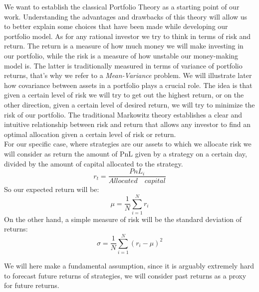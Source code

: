 We want to establish the classical Portfolio Theory as a starting point of our work. Understanding the advantages and drawbacks of this theory will allow us to better explain some choices that have been made while developing our portfolio model. As for any rational investor we try to think in terms of risk and return. The return is a measure of how much money we will make investing in our portfolio, while the risk is a measure of how unstable our money-making model is. The latter is traditionally measured in terms of variance of portfolio returns, that's why we refer to a \textit{Mean-Variance} problem. We will illustrate later how covariance between assets in a portfolio plays a crucial role. The idea is that given a certain level of risk we will try to get out the highest return, or on the other direction, given a certain level of desired return, we will try to minimize the risk of our portfolio. The traditional Markowitz theory establishes a clear and intuitive relationship between risk and return that allows any investor to find an optimal allocation given a certain level of risk or return.\\
For our specific case, where strategies are our assets to which we allocate risk we will consider as return the amount of PnL given by a strategy on a certain day, divided by the amount of capital allocated to the strategy.
$$
r_t = \frac{PnL_i}{Allocated \quad capital}
$$
So our expected return will be:
$$
\mu = \frac{1}{N}\sum\limits_{i=1}^N r_i
$$
On the other hand, a simple measure of risk will be the standard deviation of returns:
$$
\sigma = \frac{1}{N}\sum\limits_{i=1}^N (r_i - \mu)^2
$$

We will here make a fundamental assumption, since it is arguably extremely hard to forecast future returns of strategies, we will consider past returns as a proxy for future returns.\\